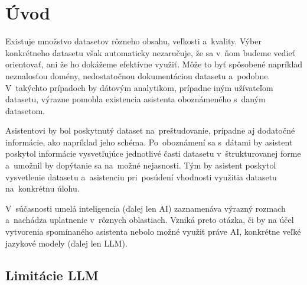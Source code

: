 \chapter{Úvod}

Existuje množstvo datasetov rôzneho obsahu, veľkosti a~kvality. Výber konkrétneho datasetu však automaticky nezaručuje, že sa v~ňom budeme vedieť orientovať, ani že ho dokážeme efektívne využiť. Môže to byť spôsobené napríklad neznalosťou domény, nedostatočnou dokumentáciou datasetu a~podobne. V~takýchto prípadoch by dátovým analytikom, prípadne iným užívateľom datasetu, výrazne pomohla existencia asistenta oboznámeného s~daným datasetom.

Asistentovi by bol poskytnutý dataset na~preštudovanie, prípadne aj dodatočné informácie, ako napríklad jeho schéma. Po~oboznámení sa s~dátami by asistent poskytol informácie vysvetľujúce jednotlivé časti datasetu v~štrukturovanej forme a~umožnil by dopýtanie sa na~možné nejasnosti. Tým by asistent poskytol vysvetlenie datasetu a~asistenciu pri~posúdení vhodnosti využitia datasetu na~konkrétnu úlohu.

V~súčasnosti umelá inteligencia (ďalej len AI) zaznamenáva výrazný rozmach a~nachádza uplatnenie v~rôznych oblastiach. Vzniká preto otázka, či by na účel vytvorenia spomínaného asistenta nebolo možné využiť práve AI, konkrétne veľké jazykové modely (ďalej len LLM).

\section{Limitácie LLM}
\label{limitacie-llm}

